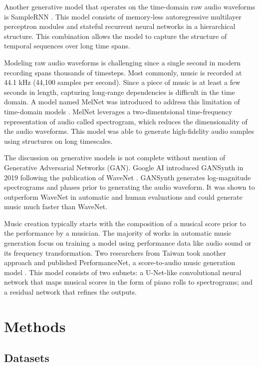 \documentclass[sigconf,authorversion]{acmart}
\begin{document}
Another generative model that operates on the time-domain raw audio waveforms is 
SampleRNN \cite{mehri_samplernn_2017}. This model consists of memory-less autoregressive 
multilayer perceptron modules and stateful recurrent neural networks in a hierarchical 
structure. This combination allows the model to capture the structure of temporal 
sequences over long time spans.

Modeling raw audio waveforms is challenging since a single second in
modern recording spans thousands of timesteps. Most commonly, music is
recorded at 44.1 kHz (44,100 samples per second). Since a piece of music
is at least a few seconds in length, capturing long-range dependencies
is difficult in the time domain. A model named MelNet was introduced to address
this limitation of time-domain models \cite{vasquez_melnet_2019-1}. MelNet 
leverages a two-dimentsional time-frequency representation of audio called 
spectrogram, which reduces the dimensionality of the audio waveforms. This 
model was able to generate high-fidelity audio samples using structures on
long timescales.

The discussion on generative models is not complete without mention of Generative
Adversarial Networks (GAN). Google AI introduced GANSynth in 2019 following the 
publication of WaveNet \cite{engel_gansynth_2019}. GANSynth generates log-magnitude
spectrograms and phases prior to generating the audio waveform. It was shown to 
outperform WaveNet in automatic and human evaluations and could generate music much
faster than WaveNet.

Music creation typically starts with the composition of a musical score prior 
to the performance by a musician. The majority of works in automatic music 
generation focus on training a model using performance data like audio sound or
 its frequency transformation. Two researchers from Taiwan took another
approach and published PerformanceNet, a score-to-audio music generation model
\cite{wang_performancenet_2018}. This model consists of two subnets: a U-Net-like 
convolutional neural network that maps musical scores in the form of piano rolls 
to spectrograms; and a residual network that refines the outputs.

\section{Methods}

\subsection{Datasets}
\end{document}
